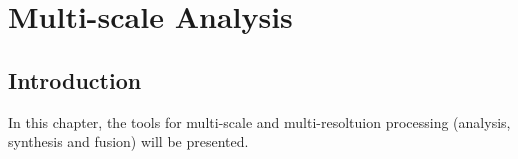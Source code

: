 \chapter{Multi-scale Analysis}
\section{Introduction}

In this chapter, the tools for multi-scale and multi-resoltuion
processing (analysis, synthesis and fusion) will be presented.





